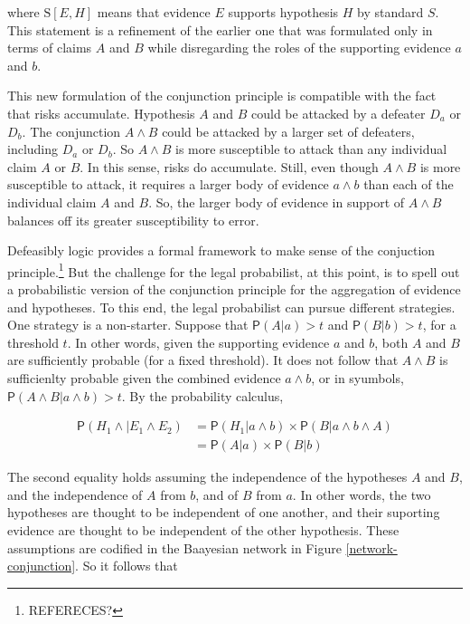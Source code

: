 \documentclass[10pt,dvipsnames,enabledeprecatedfontcommands]{scrartcl}
\newcommand{\et}{\wedge}
\newcommand{\pr}[1]{\mathsf{P}(#1)}
\begin{document}
\noindent where \(\text{S}[E, H]\) means that evidence \(E\) supports
hypothesis \(H\) by standard \(S\). This statement is a refinement of
the earlier one that was formulated only in terms of claims \(A\) and
\(B\) while disregarding the roles of the supporting evidence \(a\) and
\(b\).

This new formulation of the conjunction principle is compatible with the
fact that risks accumulate. Hypothesis \(A\) and \(B\) could be attacked
by a defeater \(D_a\) or \(D_b\). The conjunction \(A \wedge B\) could
be attacked by a larger set of defeaters, including \(D_a\) or \(D_b\).
So \(A \wedge B\) is more susceptible to attack than any individual
claim \(A\) or \(B\). In this sense, risks do accumulate. Still, even
though \(A \wedge B\) is more susceptible to attack, it requires a
larger body of evidence \(a \wedge b\) than each of the individual claim
\(A\) and \(B\). So, the larger body of evidence in support of
\(A \wedge B\) balances off its greater susceptibility to error.

Defeasibly logic provides a formal framework to make sense of the
conjuction principle.\footnote{REFERECES?} But the challenge for the
legal probabilist, at this point, is to spell out a probabilistic
version of the conjunction principle for the aggregation of evidence and
hypotheses. To this end, the legal probabilist can pursue different
strategies. One strategy is a non-starter. Suppose that \(\pr{A | a}>t\)
and \(\pr{B | b}>t\), for a threshold \(t\). In other words, given the
supporting evidence \(a\) and \(b\), both \(A\) and \(B\) are
sufficiently probable (for a fixed threshold). It does not follow that
\(A \et B\) is sufficienlty probable given the combined evidence
\(a\et b\), or in syumbols, \(\pr{A \wedge B | a \wedge b}>t\). By the
probability calculus,

\begin{align*}
\pr{H_1 \wedge  | E_1 \wedge E_2}& =\pr{H_1 |a \wedge b} \times \pr{B | a \wedge b \wedge A}\\
 & = \pr{A |a} \times \pr{B | b}
 \end{align*}

The second equality holds assuming the independence of the hypotheses
\(A\) and \(B\), and the independence of \(A\) from \(b\), and of \(B\)
from \(a\). In other words, the two hypotheses are thought to be
independent of one another, and their suporting evidence are thought to
be independent of the other hypothesis. These assumptions are codified
in the Baayesian network in Figure \ref{network-conjunction}. So it
follows that
\end{document}
